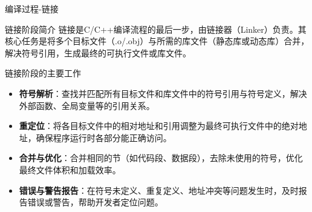 \documentclass[UTF8,aspectratio=169]{beamer}
\begin{document}
\begin{frame}{编译过程-链接}
    \begin{ytublock}{链接阶段简介}
        链接是C/C++编译流程的最后一步，由链接器（Linker）负责。其核心任务是将多个目标文件（.o/.obj）与所需的库文件（静态库或动态库）合并，解决符号引用，生成最终的可执行文件或库文件。
    \end{ytublock}
    \begin{ytublock}{链接阶段的主要工作}
        \small
        \begin{itemize}
            \item \textbf{符号解析}：查找并匹配所有目标文件和库文件中的符号引用与符号定义，解决外部函数、全局变量等的引用关系。
            \item \textbf{重定位}：将各目标文件中的相对地址和引用调整为最终可执行文件中的绝对地址，确保程序运行时各部分能正确访问。
            \item \textbf{合并与优化}：合并相同的节（如代码段、数据段），去除未使用的符号，优化最终文件体积和加载效率。
            \item \textbf{错误与警告报告}：在符号未定义、重复定义、地址冲突等问题发生时，及时报告错误或警告，帮助开发者定位问题。
        \end{itemize}
    \end{ytublock}
\end{frame}
\end{document}
